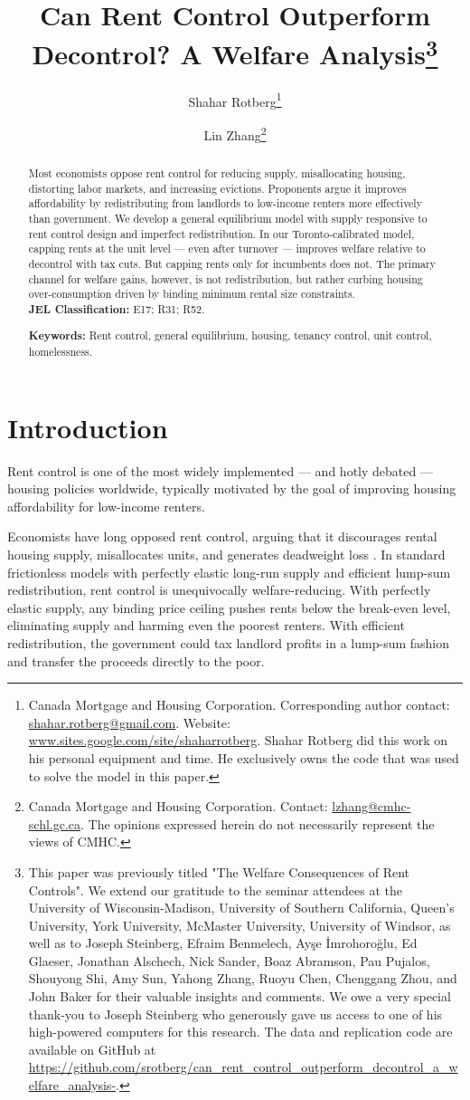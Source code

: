 \documentclass[parskip=full]{article}
\title{\vspace{-1.8cm}Can Rent Control Outperform Decontrol? A Welfare Analysis\footnote{This paper was previously titled "The Welfare Consequences of Rent Controls". We extend our gratitude to the seminar attendees at the University of Wisconsin-Madison, University of Southern California, Queen's University, York University, McMaster University, University of Windsor, as well as to Joseph Steinberg, Efraim Benmelech, Ay\c{s}e \.{I}mrohoro\u{g}lu, Ed Glaeser, Jonathan Alschech, Nick Sander, Boaz Abramson, Pau Pujalos, Shouyong Shi, Amy Sun, Yahong Zhang, Ruoyu Chen, Chenggang Zhou, and John Baker for their valuable insights and comments. We owe a very special thank-you to Joseph Steinberg who generously gave us access to one of his high-powered computers for this research. The data and replication code are available on GitHub at \url{https://github.com/srotberg/can_rent_control_outperform_decontrol_a_welfare_analysis-}.}}
\author{Shahar Rotberg\footnote{Canada Mortgage and Housing Corporation. Corresponding author contact: \url{shahar.rotberg@gmail.com}. Website: \url{www.sites.google.com/site/shaharrotberg}. Shahar Rotberg did this work on his personal equipment and time. He exclusively owns the code that was used to solve the model in this paper.} \and Lin Zhang\footnote{Canada Mortgage and Housing Corporation. Contact: \url{lzhang@cmhc-schl.gc.ca}. The opinions expressed herein do not necessarily represent the views of CMHC.}}
\begin{document}
\maketitle

\begin{abstract}
\onehalfspacing

\noindent Most economists oppose rent control for reducing supply, misallocating housing, distorting labor markets, and increasing evictions. Proponents argue it improves affordability by redistributing from landlords to low-income renters more effectively than government. We develop a general equilibrium model with supply responsive to rent control design and imperfect redistribution. In our Toronto-calibrated model, capping rents at the unit level — even after turnover — improves welfare relative to decontrol with tax cuts. But capping rents only for incumbents does not. The primary channel for welfare gains, however, is not redistribution, but rather curbing housing over-consumption driven by binding minimum rental size constraints.
\\[1.5ex]

\noindent \textbf{JEL Classification:} E17; R31; R52. 

\noindent \textbf{Keywords:} Rent control, general equilibrium, housing, tenancy control, unit control, homelessness.
\end{abstract}

\section{Introduction}

Rent control is one of the most widely implemented — and hotly debated — housing policies worldwide, typically motivated by the goal of improving housing affordability for low-income renters.

Economists have long opposed rent control, arguing that it discourages rental housing supply, misallocates units, and generates deadweight loss \citep{gl-2003}. In standard frictionless models with perfectly elastic long-run supply and efficient lump-sum redistribution, rent control is unequivocally welfare-reducing. With perfectly elastic supply, any binding price ceiling pushes rents below the break-even level, eliminating supply and harming even the poorest renters. With efficient redistribution, the government could tax landlord profits in a lump-sum fashion and transfer the proceeds directly to the poor.
\end{document}
